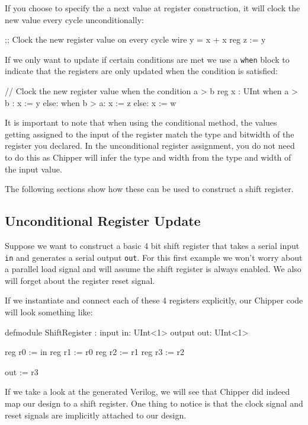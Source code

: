 If you choose to specify the a next value at register construction, it will clock the new value every cycle unconditionally:

\begin{stanza}
;; Clock the new register value on every cycle
wire y = x + x
reg z := y
\end{stanza}

If we only want to update if certain conditions are met we use a \verb+when+ block to indicate that the registers are only updated when the condition is satisfied:

\begin{stanza}
// Clock the new register value when the condition a > b
reg x : UInt
when a > b :      x := y
else: when b > a: x := z
else:             x := w
\end{stanza}

It is important to note that when using the conditional method, the values getting assigned to the input of the register match the type and bitwidth of the register you declared. In the unconditional register assignment, you do not need to do this as Chipper will infer the type and width from the type and width of the input value.

The following sections show how these can be used to construct a shift register.

\subsection{Unconditional Register Update}

Suppose we want to construct a basic 4 bit shift register that takes a serial input \verb+in+ and generates a serial output \verb+out+. For this first example we won't worry about a parallel load signal and will assume the shift register is always enabled. We also will forget about the register reset signal.

If we instantiate and connect each of these 4 registers explicitly, our Chipper code will look something like:

\begin{stanza}
defmodule ShiftRegister :
  input  in:  UInt<1>
  output out: UInt<1>

  reg r0 := in
  reg r1 := r0
  reg r2 := r1
  reg r3 := r2

  out := r3
\end{stanza}

If we take a look at the generated Verilog, we will see that Chipper did indeed map our design to a shift register. One thing to notice is that the clock signal and reset signals are implicitly attached to our design.

